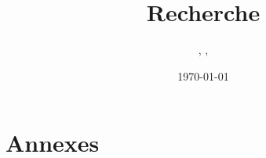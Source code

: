 \documentclass[a4paper, 11pt]{article}
\author{\glsentryname{leo}, \glsentryname{damien}, \glsentryname{pierreLouis}}
\title{Recherche}
\date{\normalsize\today} %
\begin{document}
\maketitle

\newpage
{} %

\tableofcontents

\clearpage


\clearpage


\clearpage


\clearpage


\clearpage

\part*{Annexes}
\listoffigures
\listoftables

\clearpage
\printglossary %

\clearpage
\printbibliography %
\end{document}
